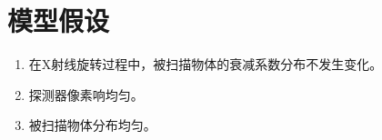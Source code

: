 \section{模型假设}
\begin{enumerate}
    \item 在X射线旋转过程中，被扫描物体的衰减系数分布不发生变化。
    \item 探测器像素响均匀。
    \item 被扫描物体分布均匀。
\end{enumerate}
